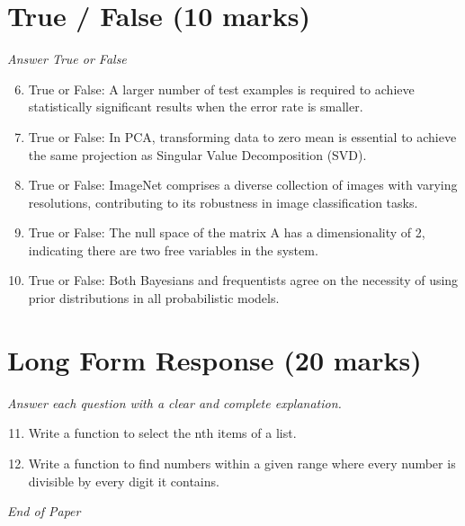 \documentclass[12pt]{article}
\begin{document}
\section*{True / False (10 marks)}
\textit{Answer True or False}
\begin{enumerate}[label=\arabic*.]
\setcounter{enumi}{5}
\item True or False: A larger number of test examples is required to achieve statistically significant results when the error rate is smaller.
\item True or False: In PCA, transforming data to zero mean is essential to achieve the same projection as Singular Value Decomposition (SVD).
\item True or False: ImageNet comprises a diverse collection of images with varying resolutions, contributing to its robustness in image classification tasks.
\item True or False: The null space of the matrix A has a dimensionality of 2, indicating there are two free variables in the system.
\item True or False: Both Bayesians and frequentists agree on the necessity of using prior distributions in all probabilistic models.
\end{enumerate}

\section*{Long Form Response (20 marks)}
\textit{Answer each question with a clear and complete explanation.}
\begin{enumerate}[label=\arabic*.]
\setcounter{enumi}{10}
\item Write a function to select the nth items of a list.
\item Write a function to find numbers within a given range where every number is divisible by every digit it contains.
\end{enumerate}

\vfill
\noindent\textit{End of Paper}
\end{document}
